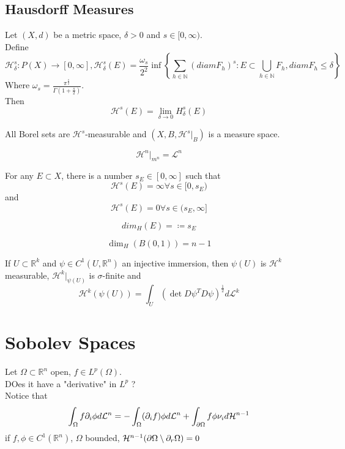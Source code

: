\documentclass[../main.tex]{subfiles}
\begin{document}
\subsection{Hausdorff Measures}
\begin{defn}
	Let $( X,d) $ be a metric space, $\delta>0$ and $s \in [ 0, \infty ) $.\\
	Define
	\[ 
		\mathcal{H}_\delta^{s}: P( X) \to [ 0, \infty  ], \mathcal{H}_\delta^{s}( E) = \frac{\omega_s}{2^{2}}\inf \left\{ \sum_{  h \in \mathbb{N} } ( diam F_h)^s: E \subset \bigcup_{h \in \mathbb{N}} F_h, diam F_h \leq \delta \right\} 
	\]
Where $\omega_s = \frac{\pi^{\frac{s}{2}}}{\Gamma( 1+ \frac{s}{2}) }$.\\
Then
\[ 
\mathcal{H}^{s}( E) = \lim_{\delta\to 0} H_\delta^{s}( E) 
\]

	
\end{defn}
\begin{lemma}
All Borel sets are $ \mathcal{H}^{s}$-measurable and $( X,B, \mathcal{H}^{s}|_B) $ is a measure space.
\end{lemma}
\begin{thm}
	\[ 
	\mathcal{H}^{n}|_{m^{n}} = \mathcal{L}^{n}
	\]
	
\end{thm}
\begin{thm}
	For any $E \subset X$, there is a number $s_E \in [ 0, \infty ] $ such that 
	\[ 
	\mathcal{H}^{s}( E) = \infty \forall s \in [ 0, s_E)
	\]
	and 
	\[ 
		\mathcal{H}^{s}( E) =0 \forall s \in ( s_E, \infty ]
	\]
	
\end{thm}
\begin{defn}
	\[ 
	dim_{H} ( E) = \coloneqq s_E
	\]
	
\end{defn}
\begin{exemple}
\[ 
\dim_H ( B( 0,1) ) = n-1
\]

\end{exemple}
\begin{thm}
	If $U \subset \mathbb{R}^{k}$ and $ \psi \in C^{1}( U, \mathbb{R}^n) $ an injective immersion, then $\psi( U) $ is $ \mathcal{H}^{k}$ measurable, $ \mathcal{H}^{k}|_{\psi( U) } $ is $\sigma$-finite and
	\[ 
	\mathcal{H}^{k}( \psi( U) ) = \int_U ( \det D\psi^{T}D\psi)^{\frac{1}{2}}d \mathcal{L}^{k}	
	\]
	
\end{thm}
\section{Sobolev Spaces}
Let $\Omega \subset \mathbb{R}^n$ open, $f\in L^{p}( \Omega) $.\\
DOes it have a "derivative" in $L^{p}$ ?\\
Notice that
\[ 
\int_{ \Omega }^{  } f \partial_i \phi d \mathcal{L}^{n}= - \int_{ \Omega }^{  } ( \partial_i f) \phi d \mathcal{L}^{n} + \int_{ \partial \Omega }^{  } f \phi \nu_i d \mathcal{H}^{n-1}
\]
if $f,\phi \in C^{1}(  \mathbb{R}^n) $, $\Omega$ bounded, $\mathcal{H}^{n-1}( \partial \Omega \setminus \partial_r \Omega) =0$ 
\end{document}
